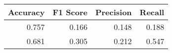 \begin{tabular}{rrrr}
\toprule
Accuracy & F1 Score & Precision & Recall \\
\midrule
0.757 & 0.166 & 0.148 & 0.188 \\
0.681 & 0.305 & 0.212 & 0.547 \\
\bottomrule
\end{tabular}
